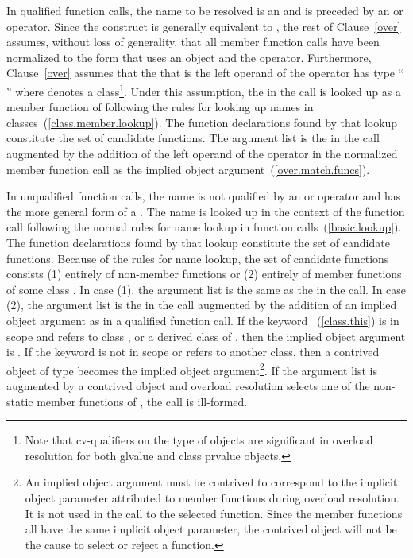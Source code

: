 \pnum
In qualified function calls, the name to be resolved is an
and is preceded by an
\tcode{->}
or
operator.
Since the
construct
is generally equivalent to
,
the rest of
Clause~\ref{over} assumes, without loss of generality, that all member
function calls have been normalized to the form that uses an
object and the
operator.
Furthermore, Clause~\ref{over} assumes that
the
that is the left operand of the
operator
has type ``\cv{}
''
where
denotes a class\footnote{Note that cv-qualifiers on the type of objects are
significant in overload
resolution for
both glvalue and class prvalue objects.}.
Under this
assumption, the
in the call is looked up as a
member function of
following the rules for looking up names in
classes~(\ref{class.member.lookup}).
The function declarations found by that lookup constitute the set of
candidate functions.
The argument list is the
in the call augmented by the addition of the left operand of
the
operator in the normalized member function call as the
implied object argument~(\ref{over.match.funcs}).

\pnum
In unqualified function calls, the name is not qualified by an
\tcode{->}
or
operator and has the more general form of a
.
The name is looked up in the context of the function
call following the normal rules for name lookup in function
calls~(\ref{basic.lookup}).
The function declarations found by that lookup constitute the
set of candidate functions.
Because of the rules for name lookup, the set of candidate functions
consists (1) entirely of non-member functions or (2) entirely of
member functions of some class
.
In case (1),
the argument list is
the same as the
in the call.
In case (2), the argument list is the
in the call augmented by the addition of an implied object
argument as in a qualified function call.
If the keyword
~(\ref{class.this}) is in scope and refers to
class
,
or a derived class of
,
then the implied object argument is
.
If the keyword
is not in
scope or refers to another class, then
a contrived object of type
becomes the implied object
argument\footnote{An implied object argument must be contrived to
correspond to the implicit object
parameter attributed to member functions during overload resolution.
It is not
used in
the call to the selected function.
Since the member functions all have the
same implicit
object parameter, the contrived object will not be the cause to select or
reject a
function.}.
If the argument list is augmented by a contrived object and overload
resolution selects one of the non-static member functions of
,
the call is ill-formed.

